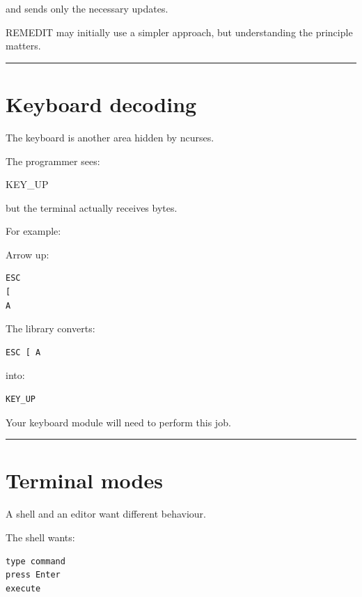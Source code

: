 \documentclass[
  oneside,
  openany]{book}
\newenvironment{Shaded}{\begin{snugshade}}{\end{snugshade}}
\newcommand{\NormalTok}[1]{#1}
\begin{document}
and sends only the necessary updates.

REMEDIT may initially use a simpler approach, but understanding the
principle matters.

\begin{center}\rule{0.5\linewidth}{0.5pt}\end{center}

\hypertarget{keyboard-decoding}{%
\section{Keyboard decoding}\label{keyboard-decoding}}

The keyboard is another area hidden by ncurses.

The programmer sees:

\begin{Shaded}
\begin{Highlighting}[]
\NormalTok{KEY\_UP}
\end{Highlighting}
\end{Shaded}

but the terminal actually receives bytes.

For example:

Arrow up:

\begin{verbatim}
ESC
[
A
\end{verbatim}

The library converts:

\begin{verbatim}
ESC [ A
\end{verbatim}

into:

\begin{verbatim}
KEY_UP
\end{verbatim}

Your keyboard module will need to perform this job.

\begin{center}\rule{0.5\linewidth}{0.5pt}\end{center}

\hypertarget{terminal-modes}{%
\section{Terminal modes}\label{terminal-modes}}

A shell and an editor want different behaviour.

The shell wants:

\begin{verbatim}
type command
press Enter
execute
\end{verbatim}
\end{document}
